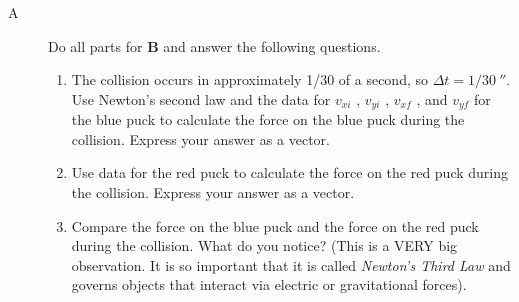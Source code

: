 \begin{description}
\item[A] Do all parts for {\bf B} and answer the following questions.

\begin{enumerate}
	\item The collision occurs in approximately 1/30 of a second, so $\Delta t=1/30\ \second$. Use Newton's second law and the data for $v_{xi}$ , $v_{yi}$ , $v_{xf}$ , and $v_{yf}$ for the blue puck to calculate the force on the blue puck during the collision. Express your answer as a vector.
	\item Use data for the red puck to calculate the force on the red puck during the collision. Express your answer as a vector.
	\item Compare the force on the blue puck and the force on the red puck during the collision. What do you notice?  (This is a VERY big observation. It is so important that it is called \emph{Newton's Third Law} and governs objects that interact via electric or gravitational forces).
\end{enumerate}
\end{description}


%
%
%
%
%

